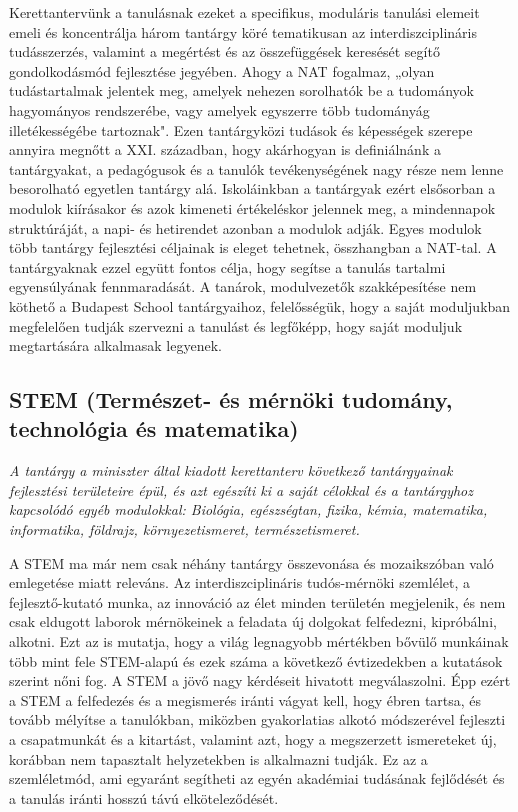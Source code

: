 Kerettantervünk a tanulásnak ezeket a specifikus, moduláris tanulási elemeit emeli és koncentrálja három tantárgy köré tematikusan az interdiszciplináris tudásszerzés, valamint a megértést és az összefüggések keresését segítő gondolkodásmód fejlesztése jegyében. Ahogy a NAT fogalmaz, „olyan tudástartalmak jelentek meg, amelyek nehezen sorolhatók be a tudományok hagyományos rendszerébe, vagy amelyek egyszerre több tudományág illetékességébe tartoznak". Ezen tantárgyközi tudások és képességek szerepe annyira megnőtt a XXI. században, hogy akárhogyan is definiálnánk a tantárgyakat, a pedagógusok és a tanulók tevékenységének nagy része nem lenne besorolható egyetlen tantárgy alá. Iskoláinkban a tantárgyak ezért elsősorban a modulok kiírásakor és azok kimeneti értékeléskor jelennek meg, a mindennapok struktúráját, a napi- és hetirendet azonban a modulok adják. Egyes modulok több tantárgy fejlesztési céljainak is eleget tehetnek, összhangban a NAT-tal. A tantárgyaknak ezzel együtt fontos célja, hogy segítse a tanulás tartalmi egyensúlyának fennmaradását. A tanárok, modulvezetők szakképesítése nem köthető a Budapest School tantárgyaihoz, felelősségük, hogy a saját moduljukban megfelelően tudják szervezni a tanulást és legfőképp, hogy saját moduljuk megtartására alkalmasak legyenek.

\subsection[STEM]{STEM  (Természet- és mérnöki  tudomány, technológia és matematika)}
\emph{A tantárgy a miniszter által kiadott kerettanterv következő tantárgyainak fejlesztési területeire épül, és azt egészíti ki a saját célokkal és a tantárgyhoz kapcsolódó egyéb modulokkal:
Biológia, egészségtan, fizika, kémia, matematika, informatika, földrajz, környezetismeret, természetismeret.}


A STEM ma már nem csak néhány tantárgy összevonása és  mozaikszóban való emlegetése miatt releváns. Az interdiszciplináris tudós-mérnöki szemlélet, a fejlesztő-kutató munka, az innováció az élet minden területén megjelenik, és nem csak eldugott laborok mérnökeinek a feladata új dolgokat felfedezni, kipróbálni, alkotni. Ezt az is mutatja, hogy a világ legnagyobb mértékben bővülő munkáinak több mint fele STEM-alapú és ezek száma a következő évtizedekben a kutatások szerint nőni fog. A STEM a jövő nagy kérdéseit hivatott megválaszolni. Épp ezért a STEM a felfedezés és a megismerés iránti vágyat kell, hogy ébren tartsa, és tovább mélyítse a tanulókban, miközben gyakorlatias alkotó módszerével fejleszti a csapatmunkát és a kitartást, valamint azt, hogy a megszerzett ismereteket új, korábban nem tapasztalt helyzetekben is alkalmazni tudják. Ez az a szemléletmód, ami egyaránt segítheti az egyén akadémiai tudásának fejlődését és a tanulás iránti hosszú távú elköteleződését.

